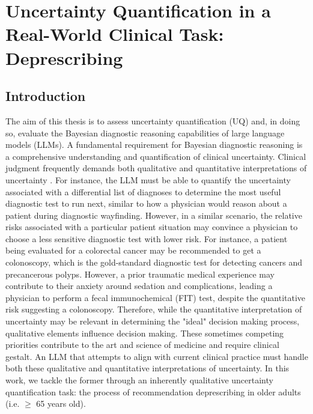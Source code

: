 \chapter{Uncertainty Quantification in a Real-World Clinical Task: Deprescribing} \label{chapter:deprescribing}

\section{Introduction}
The aim of this thesis is to assess uncertainty quantification (UQ) and, in doing so, evaluate the Bayesian diagnostic reasoning capabilities of large language models (LLMs). A fundamental requirement for Bayesian diagnostic reasoning is a comprehensive understanding and quantification of clinical uncertainty. Clinical judgment frequently demands both qualitative and quantitative interpretations of uncertainty \cite{feinsteinClinicalJudgmentRevisited1994a}. For instance, the LLM must be able to quantify the uncertainty associated with a differential list of diagnoses to determine the most useful diagnostic test to run next, similar to how a physician would reason about a patient during diagnostic wayfinding. However, in a similar scenario, the relative risks associated with a particular patient situation may convince a physician to choose a less sensitive diagnostic test with lower risk. For instance, a patient being evaluated for a colorectal cancer may be recommended to get a colonoscopy, which is the gold-standard diagnostic test for detecting cancers and precancerous polyps. However, a prior traumatic medical experience may contribute to their anxiety around sedation and complications, leading a physician to perform a fecal immunochemical (FIT) test, despite the quantitative risk suggesting a colonoscopy. Therefore, while the quantitative interpretation of uncertainty may be relevant in determining the "ideal" decision making process, qualitative elements influence decision making. These sometimes competing priorities contribute to the art and science of medicine and require clinical gestalt. An LLM that attempts to align with current clinical practice must handle both these qualitative and quantitative interpretations of uncertainty. In this work, we tackle the former through an inherently qualitative uncertainty quantification task: the process of recommendation deprescribing in older adults (i.e. $\geq$ 65 years old). 

